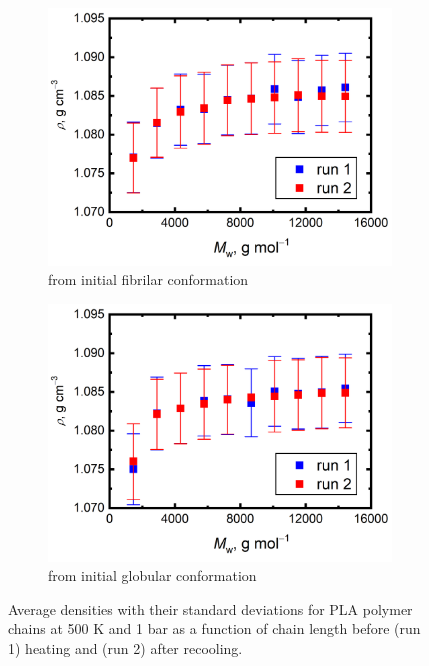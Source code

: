 \begin{figure}[htb!]
	\begin{subfigure}{0.5\textwidth}
		\includegraphics[width=1.0\linewidth]{img/pla_linear_density.png} 
		\caption{from initial fibrilar conformation}
		\vspace{-0.2cm}
	\end{subfigure}
	\begin{subfigure}{0.5\textwidth}
		\includegraphics[width=1.0\linewidth]{img/pla_glob_density.png}
		\caption{from initial globular conformation}
		\vspace{-0.2cm}
	\end{subfigure} 
	\caption{Average densities with their standard deviations for PLA polymer chains at 500 K and 1 bar as a function of chain length before (run 1) heating and (run 2) after recooling.}
	\label{fig:pla_hustoty}
	\vspace{-0.2cm}
\end{figure}

